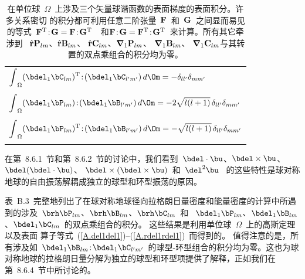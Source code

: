 \begin{table}[!t]
\begin{tabular}{|l|}
$\displaystyle{\int}_{\Omega}(\bdel_1\bC_{lm})^{\rm T}
\!:\!(\bdel_1\bC_{l'm'})\,d\/\Om=
-\delta_{ll'}\delta_{mm'}$ \hspace{1.0 mm} \\ \\ \hspace{1.2 mm}
$\displaystyle{\int}_{\Omega}(\bdel_1\bP_{lm})
\!:\!(\bdel_1\bB_{l'm'})\,d\Om=
-2\sqrt{l(l+1)}\,\delta_{ll'}\delta_{mm'}$ \hspace{1.0 mm} \\ \\ \hspace{1.2 mm}
$\displaystyle{\int}_{\Omega}(\bdel_1\bP_{lm})^{\rm T}
\!:\!(\bdel_1\bB_{l'm'})\,d\/\Om=
-\sqrt{l(l+1)}\,\delta_{ll'}\delta_{mm'}$ \hspace{1.0 mm} \\ \\
\hline
\end{tabular}
\caption[energyints]
{在单位球~$\Omega$~上涉及三个矢量球谐函数的表面梯度的表面积分。许多关系密切
的积分都可利用任意二阶张量~${\bf F}$~和~${\bf G}$~之间显而易见的等式~${\bf F}^{\rm T}\!:\!{\bf G}={\bf F}\!:\!{\bf G}^{\rm T}$~~和${\bf F}\!:\!{\bf G}={\bf F}^{\rm T}\!:\!{\bf G}^{\rm T}$~来计算。所有其它牵涉到~
$\hat{\bf r}{\bf P}_{lm}$、$\hat{\bf r}{\bf B}_{lm}$、
$\hat{\bf r}{\bf C}_{lm}$、$\mbox{\boldmath$\nabla$}_1{\bf P}_{lm}$、
$\mbox{\boldmath$\nabla$}_1{\bf B}_{lm}$、
$\mbox{\boldmath$\nabla$}_1{\bf C}_{lm}$与其转置的双点乘组合的积分均为零。}

\vspace*{\fill}
\end{table}
在第~8.6.1~节和第~8.6.2~节的讨论中，我们看到~$\bdel\cdot\bu$、$\bdel\times\bu$、 $\bdel(\bdel\cdot\bu)$、
$\bdel\times(\bdel\times\bu)$~和~$\del^2\bu$~ 的这些特性是球对称地球的自由振荡解耦成独立的球型和环型振荡的原因。

表~B.3~完整地列出了在球对称地球径向拉格朗日量密度和能量密度的计算中所遇到的涉及~$\brh\bP_{lm}$、$\brh\bB_{lm}$、$\brh\bC_{lm}$~和~
$\bdel_1\bP_{lm}$、$\bdel_1\bB_{lm}$、$\bdel_1\bC_{lm}$~的双点乘组合的积分。
这些结果是利用单位球~$\Omega$~上的高斯定理以及表面
算子等式~(\ref{A.del1del1})--(\ref{A.rdel1rdel1})~而得到的。
值得注意的是，所有涉及如~$\bdel_1\bB_{lm}\!:\!\bdel_1\bC_{l'm'}$~的球型-环型组合的积分均为零。这也为球对称地球的拉格朗日量分解为独立的球型和环型项提供了解释，正如我们在第~8.6.4~节中所讨论的。
%
%
%
%

